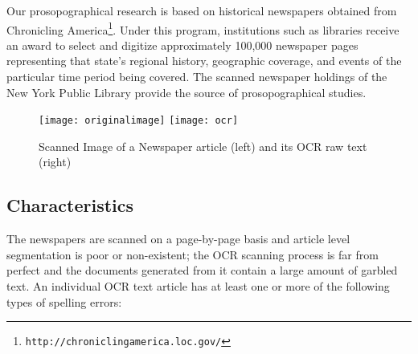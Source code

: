 Our prosopographical research is based on historical newspapers obtained from Chronicling America\footnote{\texttt{http://chroniclingamerica.loc.gov/}}. 
Under this program, institutions such as libraries receive an award to select and digitize approximately 100,000 newspaper pages representing that state's regional history, geographic coverage, and events of the particular time period being covered. The scanned newspaper holdings of the New York Public Library provide the source of prosopographical studies. 

\begin{figure*}
\texttt{[image: originalimage]}
\texttt{[image: ocr]}
\caption{Scanned Image of a Newspaper article (left) and its OCR raw text (right)}
\vspace{-10pt}
\label{figure:1}

\end{figure*}

\subsection{Characteristics}
The newspapers are scanned on a page-by-page basis and article level
segmentation is poor or non-existent; the OCR scanning process is far
from perfect and the documents generated from it contain a large
amount of garbled text.
An individual OCR text article has at least one or more of the following types of spelling errors:

